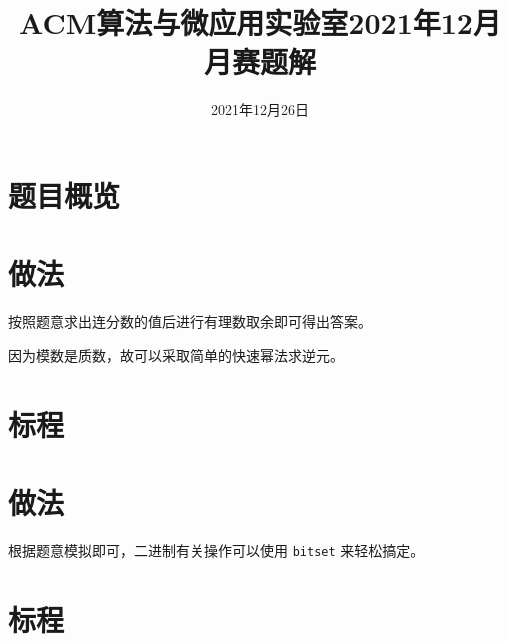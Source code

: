 \documentclass{ctsol}
\title{ACM算法与微应用实验室2021年12月月赛题解}
\date{2021年12月26日}
\begin{document}
\maketitle
{}

\section*{题目概览}
\solutiontab

\makesolution
\section*{做法}
按照题意求出连分数的值后进行有理数取余即可得出答案。

因为模数是质数，故可以采取简单的快速幂法求逆元。

\section*{标程}

\makesolution
\section*{做法}
根据题意模拟即可，二进制有关操作可以使用 \verb|bitset| 来轻松搞定。

\section*{标程}
\end{document}
